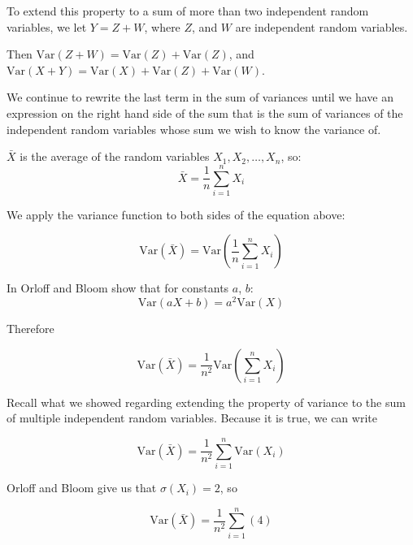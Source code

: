 \documentclass[a4paper,11pt]{article}
\begin{document}
To extend this property to a sum of more than two independent random variables,
we let $Y=Z+W$, where $Z$, and $W$ are independent random variables.

Then $\text{Var}\left( Z + W \right) = \text{Var}\left( Z \right) +
\text{Var}\left( Z \right)$, and $\text{Var}\left( X + Y\right) =
  \text{Var}\left( X \right) + \text{Var}\left(Z \right)
  + \text{Var}\left(W \right)$.

We continue to rewrite the last term in the sum of variances until we have
an expression on the right hand side of the sum that is the sum of variances
of the independent random variables whose sum we wish to know the variance of.

$\bar{X}$ is the average of the random variables $X_{1}, X_{2}, \ldots, X_{n}$,
so:
\begin{equation}
\bar{X}
  = \frac{1}{n}\sum_{i=1}^{n} X_{i}
\end{equation}

We apply the variance function to both sides of the equation above:


\begin{equation}
\text{Var}\left( \bar{X} \right)
  = \text{Var} \left( \frac{1}{n}\sum_{i=1}^{n} X_{i} \right)
\end{equation}

In \cite{reading5a} Orloff and Bloom show that for constants $a$, $b$:
\begin{equation}
  \text{Var} \left( aX + b \right) = a^{2}\text{Var}\left(X \right)
\end{equation}

Therefore

\begin{equation}
\text{Var}\left( \bar{X} \right)
  = \frac{1}{n^{2}} \text{Var} \left( \sum_{i=1}^{n} X_{i} \right)
\end{equation}

Recall what we showed regarding extending the property of variance to the sum
of multiple independent random variables. Because it is true, we can write

\begin{equation}
\text{Var}\left( \bar{X} \right)
  = \frac{1}{n^{2}} \sum_{i=1}^{n} \text{Var} \left( X_{i} \right)
\end{equation}

Orloff and Bloom give us that $\sigma(X_{i})=2$, so

\begin{equation}
\text{Var}\left( \bar{X} \right)
  = \frac{1}{n^{2}} \sum_{i=1}^{n} \left( 4 \right)
\end{equation}
\end{document}

